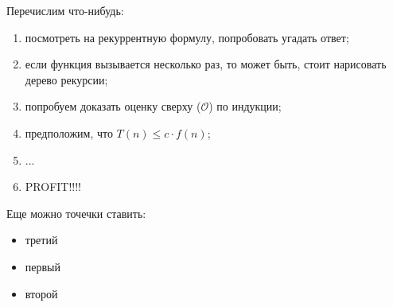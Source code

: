 \documentclass{article}
\begin{document}
Перечислим что-нибудь:
\begin{enumerate}
  \item посмотреть на рекуррентную формулу, попробовать угадать ответ;
  \item если функция вызывается несколько раз, то может быть, стоит нарисовать дерево рекурсии;
  \item попробуем доказать оценку сверху ($\mathcal{O}$) по индукции;
  \item предположим, что $T(n) \le c \cdot f(n)$;
  \item ...
  \item PROFIT!!!!
\end{enumerate}

Еще можно точечки ставить:
\begin{itemize}
  \item третий
  \item первый
  \item второй
\end{itemize}
\end{document}

